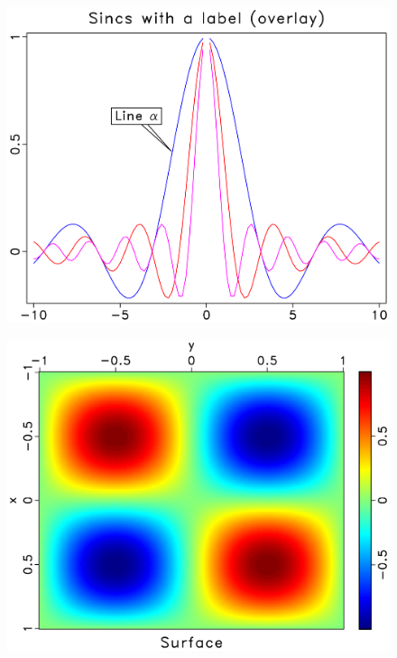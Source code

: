 \begin{frame}
  \begin{figure}
  \includegraphics[scale=0.25]{plot/Fig/mbmincs.pdf}
  \end{figure}
\end{frame}

\begin{frame}
  \begin{figure}
  \includegraphics[scale=0.25]{plot/Fig/sqsurf.pdf}
  \end{figure}
\end{frame}

